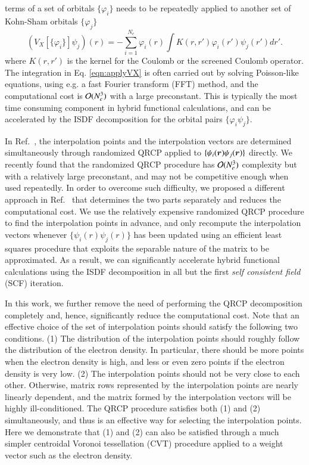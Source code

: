 terms of a set of orbitals $\{\varphi_i\}$ needs to be repeatedly applied to
another set of Kohn-Sham orbitals $\{\varphi_j\}$
\begin{equation}\label{eqn:applyVX}
  \left(V_{X}[\{\varphi_{i}\}]\psi_{j}\right)(r) = -\sum_{i=1}^{N_{e}} \varphi_
  {i}(r) \int K(r,r')\varphi_{i}(r')\psi_{j}(r') dr'.
\end{equation}
where $K(r, r')$ is the kernel for the Coulomb or the screened Coulomb
operator.  The integration in Eq. \ref{eqn:applyVX} is often carried out by
solving Poisson-like equations, using e.g. a fast Fourier transform (FFT)
method, and the computational cost is $\mathcal{O}(N_e^3)$ with a large preconstant.
This is typically the most time consuming component in hybrid functional
calculations, and can be accelerated by the ISDF decomposition for the orbital
pairs $\{\varphi_{i}\psi_{j}\}$.

In Ref.~\cite{JCP_302_329_2015_ISDF}, the interpolation points and the
interpolation vectors are determined simultaneously through randomized QRCP
applied to $\{\psi_{i}(\bm{r})\psi_{j}(\bm{r})\}$ directly. We recently found that the
randomized QRCP procedure has $\mathcal{O}(N_{e}^3)$ complexity but with a relatively
large preconstant, and may not be competitive enough when used repeatedly. In
order to overcome such difficulty, we proposed a different approach in 
Ref.~\cite{JCTC_2017_ISDF} that determines the two parts separately and reduces
the computational cost. We use the relatively expensive randomized QRCP
procedure to find the interpolation points in advance, and only recompute the
interpolation vectors whenever $\{\psi_{i}(r)\psi_{j}(r)\}$ has been updated
using an efficient least squares procedure that exploits the separable nature of
the matrix to be approximated. As a result, we can significantly accelerate
hybrid functional calculations using the ISDF decomposition in all but the first
\emph{self consistent field} (SCF) iteration.

In this work, we further remove the need of performing the QRCP decomposition
completely and, hence, significantly reduce the computational cost. Note that an
effective choice of the set of interpolation points should satisfy the following
two conditions. (1) The distribution of the interpolation points should roughly
follow the distribution of the electron density. In particular, there should be
more points when the electron density is high, and less or even zero points if
the electron density is very low. (2) The interpolation points should not be very
close to each other.  Otherwise, matrix rows represented by the interpolation
points are nearly linearly dependent, and the matrix formed by the interpolation
vectors will be highly ill\hyp{}conditioned.  The QRCP procedure satisfies both 
(1) and (2) simultaneously, and thus is an effective way for selecting the
interpolation points.  Here we demonstrate that (1) and (2) can also be satisfied
through a much simpler centroidal Voronoi tessellation (CVT) procedure applied
to a weight vector such as the electron density.

